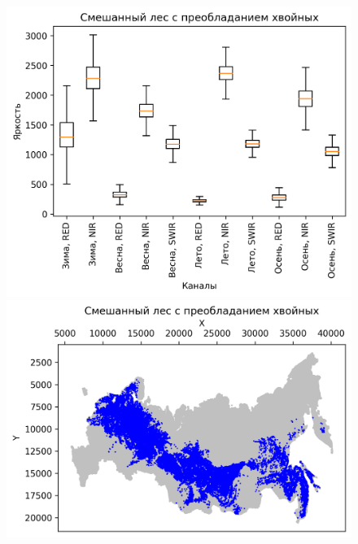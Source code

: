 \documentclass[14pt, a4paper, oneside]{extarticle}
\begin{document}
\begin{figure}[H]
    \centering
    \includegraphics[]{class-10-boxplot}
    \includegraphics[]{class-10-map}
\end{figure}
\end{document}
